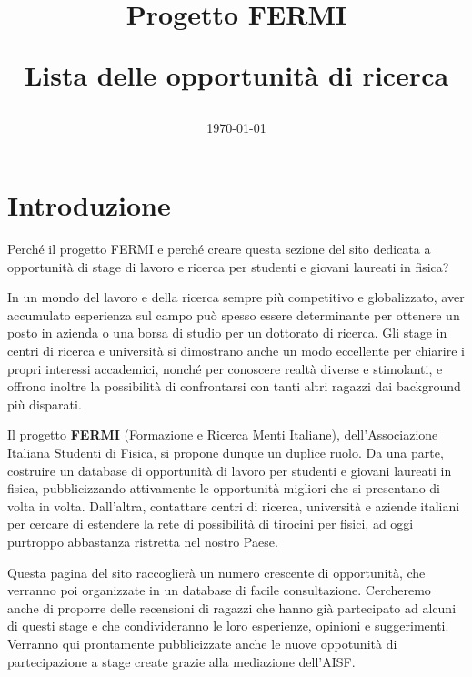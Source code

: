 \documentclass[a4paper,10pt]{article}
\title{Progetto FERMI\\
  \begin{large}
    Lista delle opportunità di ricerca
  \end{large}}
\date{\today} %
\begin{document}
\maketitle
{}


\section*{Introduzione} %

Perché il progetto FERMI e perché creare questa sezione del sito dedicata a opportunità di stage di lavoro e ricerca per studenti e giovani laureati in fisica? \newline

In un mondo del lavoro e della ricerca sempre più competitivo e globalizzato, aver accumulato esperienza sul campo può spesso essere determinante per ottenere un posto in azienda o una borsa di studio per un dottorato di ricerca. Gli stage in centri di ricerca e università si dimostrano anche un modo eccellente per chiarire i propri interessi accademici, nonché per conoscere realtà diverse e stimolanti, e offrono inoltre la possibilità di confrontarsi con tanti altri ragazzi dai background più disparati. \newline

Il progetto \textbf{FERMI} (Formazione e Ricerca Menti Italiane), dell’Associazione Italiana Studenti di Fisica, si propone dunque un duplice ruolo. Da una parte, costruire un database di opportunità di lavoro per studenti e giovani laureati in fisica, pubblicizzando attivamente le opportunità migliori che si presentano di volta in volta. Dall’altra, contattare centri di ricerca, università e aziende italiani per cercare di estendere la rete di possibilità di tirocini per fisici, ad oggi purtroppo abbastanza ristretta nel nostro Paese. \newline

Questa pagina del sito raccoglierà un numero crescente di opportunità, che verranno poi organizzate in un database di facile consultazione. Cercheremo anche di proporre delle recensioni di ragazzi che hanno già partecipato ad alcuni di questi stage e che condivideranno le loro esperienze, opinioni e suggerimenti. Verranno qui prontamente pubblicizzate anche le nuove oppotunità di partecipazione a stage create grazie alla mediazione dell’AISF. \newline
\end{document}
